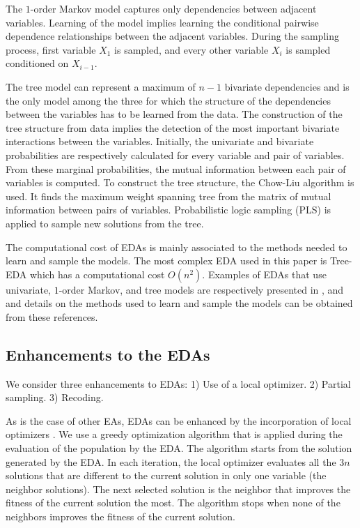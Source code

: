 The $1$-order Markov model  captures only dependencies between adjacent variables. Learning of the model implies learning the conditional pairwise dependence relationships between the adjacent variables. During the sampling process, first variable $X_1$ is sampled, and every other variable $X_i$ is sampled conditioned on $X_{i-1}$.  


The tree model can represent a maximum of $n-1$ bivariate dependencies and is the only model among the three for which the structure of the dependencies between the variables has to be learned from the data. The  construction of the tree structure from data implies the detection of the most important bivariate interactions between the variables. Initially, the univariate and bivariate probabilities are respectively calculated for every variable and pair of variables.  From these marginal probabilities, the mutual information between each pair of variables is computed. To construct the tree structure, the Chow-Liu algorithm \cite{Chow_and_Liu:1968} is used.  It finds the maximum  weight spanning tree  from the matrix of mutual information between pairs of variables. Probabilistic logic sampling (PLS) \cite{Henrion:1988} is applied to sample new solutions from the tree.


The computational cost of EDAs is mainly associated to the methods needed to learn and sample the models. The most complex EDA used in this paper is Tree-EDA which has a computational cost $O(n^2)$. Examples of EDAs that use univariate, $1$-order Markov, and tree models  are respectively presented in \cite{Muhlenbein_and_Paas:1996r}, \cite{DeBonet_et_al:1996r} and~\cite{Baluja_and_Davies:1997r,Santana_et_al:2008a} and details on the methods used to learn and sample the models can be obtained from these references. 


 \subsection{Enhancements to the EDAs} \label{sec:ENH}

   We consider three enhancements to EDAs: 1) Use of a local optimizer. 2) Partial sampling. 3) Recoding. 
 
   As is the case of other EAs, EDAs can be enhanced by the incorporation of local optimizers \cite{Pelikan_and_Goldberg:2003,Santana_et_al:2008f}. We use a greedy optimization algorithm that is applied during the evaluation of the population by the EDA.  The algorithm starts from the solution generated by the EDA. In each iteration, the local optimizer evaluates all the $3n$ solutions that are different to the current solution in only one variable (the neighbor solutions). The next selected solution is the neighbor that improves  the fitness of the current solution the most. The algorithm stops when none of the neighbors improves the fitness of the current solution. 
 
